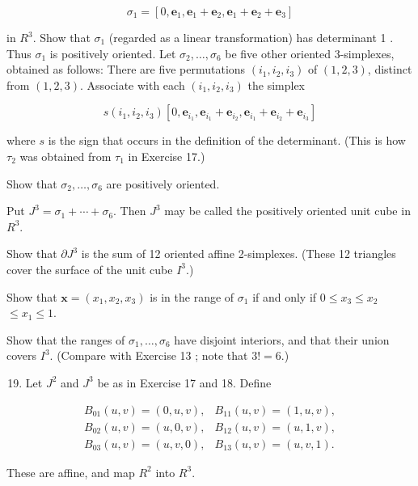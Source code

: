 \documentclass[10pt]{article}
\begin{document}
$$
\sigma_{1}=\left[0, \mathbf{e}_{1}, \mathbf{e}_{1}+\mathbf{e}_{2}, \mathbf{e}_{1}+\mathbf{e}_{2}+\mathbf{e}_{3}\right]
$$

in $R^{3}$. Show that $\sigma_{1}$ (regarded as a linear transformation) has determinant 1 . Thus $\sigma_{1}$ is positively oriented. Let $\sigma_{2}, \ldots, \sigma_{6}$ be five other oriented 3-simplexes, obtained as follows: There are five permutations $\left(i_{1}, i_{2}, i_{3}\right)$ of $(1,2,3)$, distinct from $(1,2,3)$. Associate with each $\left(i_{1}, i_{2}, i_{3}\right)$ the simplex

$$
s\left(i_{1}, i_{2}, i_{3}\right)\left[0, \mathbf{e}_{i_{1}}, \mathbf{e}_{i_{1}}+\mathbf{e}_{i_{2}}, \mathbf{e}_{i_{1}}+\mathbf{e}_{i_{2}}+\mathbf{e}_{i_{3}}\right]
$$

where $s$ is the sign that occurs in the definition of the determinant. (This is how $\tau_{2}$ was obtained from $\tau_{1}$ in Exercise 17.)

Show that $\sigma_{2}, \ldots, \sigma_{6}$ are positively oriented.

Put $J^{3}=\sigma_{1}+\cdots+\sigma_{6}$. Then $J^{3}$ may be called the positively oriented unit cube in $R^{3}$.

Show that $\partial J^{3}$ is the sum of 12 oriented affine 2-simplexes. (These 12 triangles cover the surface of the unit cube $I^{3}$.)

Show that $\mathbf{x}=\left(x_{1}, x_{2}, x_{3}\right)$ is in the range of $\sigma_{1}$ if and only if $0 \leq x_{3} \leq x_{2}$ $\leq x_{1} \leq 1$.

Show that the ranges of $\sigma_{1}, \ldots, \sigma_{6}$ have disjoint interiors, and that their union covers $I^{3}$. (Compare with Exercise 13 ; note that $3 !=6$.)

\begin{enumerate}
  \setcounter{enumi}{18}
  \item Let $J^{2}$ and $J^{3}$ be as in Exercise 17 and 18. Define
\end{enumerate}

$$
\begin{array}{ll}
B_{01}(u, v)=(0, u, v), & B_{11}(u, v)=(1, u, v), \\
B_{02}(u, v)=(u, 0, v), & B_{12}(u, v)=(u, 1, v), \\
B_{03}(u, v)=(u, v, 0), & B_{13}(u, v)=(u, v, 1) .
\end{array}
$$

These are affine, and map $R^{2}$ into $R^{3}$.
\end{document}
